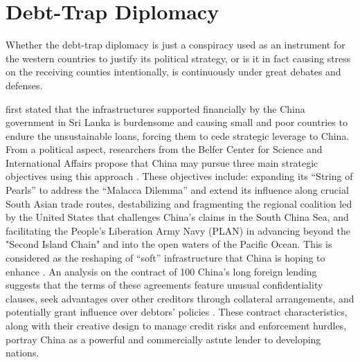 \section*{Debt-Trap Diplomacy}
Whether the debt-trap diplomacy is just a conspiracy used as an instrument for the western countries to justify its political strategy, or is it in fact causing stress on the receiving counties intentionally, is continuously under great debates and defenses.

\citet{Chellaney_2017} first stated that the infrastructures supported financially by the China government in Sri Lanka is burdensome and causing small and poor countries to endure the unsustainable loans, forcing them to cede strategic leverage to China.
From a political aspect,
researchers from the Belfer Center for Science and International Affairs propose that China may pursue three main strategic objectives using this approach \citep*{Parker2018}.
These objectives include: expanding its ``String of Pearls'' to address the ``Malacca Dilemma\footnotemark{}'' and extend its influence along crucial South Asian trade routes, destabilizing and fragmenting the regional coalition led by the United States that challenges China's claims in the South China Sea, and facilitating the People's Liberation Army Navy (PLAN) in advancing beyond the "Second Island Chain" and into the open waters of the Pacific Ocean.
This is considered as the reshaping of ``soft'' infrastructure that China is hoping to enhance \citep{Jonathan-Hillman-18}.
An analysis on the contract of 100 China's long foreign lending suggests that the terms of these agreements feature unusual confidentiality clauses, seek advantages over other creditors through collateral arrangements, and potentially grant influence over debtors' policies \citep{Gelpern-22}. These contract characteristics, along with their creative design to manage credit risks and enforcement hurdles, portray China as a powerful and commercially astute lender to developing nations.

